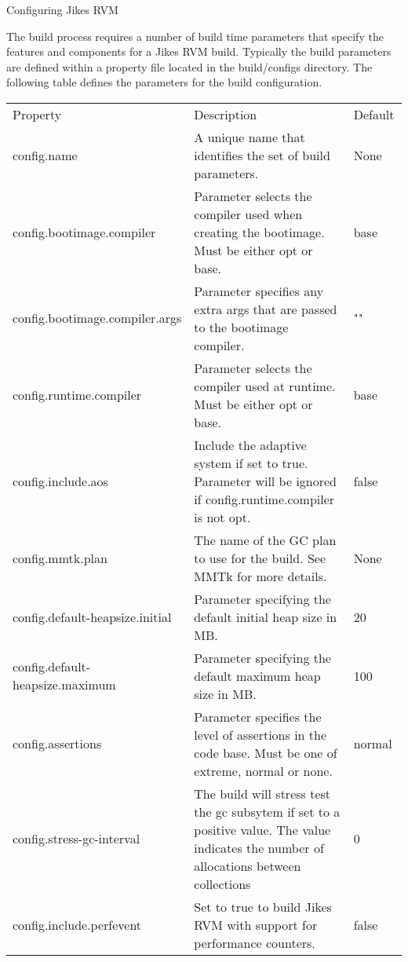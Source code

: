 \begin{section}{Configuring Jikes RVM}
\label{sec:configuringjikesrvm}

The build process requires a number of build time parameters that specify the features and components for a Jikes RVM build. Typically the build parameters are defined within a property file located in the build/configs directory. The following table defines the parameters for the build configuration.

\begin{table}
\centering
\begin{tabular}{p{0.25\linewidth}p{0.6\linewidth}p{0.15\linewidth}}
Property & Description & Default \\
config.name & A unique name that identifies the set of build parameters. & None \\
config.bootimage.\newline compiler & Parameter selects the compiler used when creating the bootimage. Must be either opt or base. & base \\
config.bootimage.\newline compiler.args & Parameter specifies any extra args that are passed to the bootimage compiler. & "" \\
config.runtime.\newline compiler & Parameter selects the compiler used at runtime. Must be either opt or base. & base \\
config.include.\newline aos & Include the adaptive system if set to true. Parameter will be ignored if config.runtime.compiler is not opt. & false \\
config.mmtk.plan & The name of the GC plan to use for the build. See MMTk for more details. & None \\
config.default-heapsize.initial & Parameter specifying the default initial heap size in MB. & 20 \\
config.default-heapsize.maximum & Parameter specifying the default maximum heap size in MB. & 100 \\
config.assertions & Parameter specifies the level of assertions in the code base. Must be one of extreme, normal or none. & normal \\
config.stress-gc-interval & The build will stress test the gc subsytem if set to a positive value. The value indicates the number of allocations between collections & 0 \\
config.include.\newline perfevent & Set to true to build Jikes RVM with support for performance counters. & false \\

\end{tabular}
\end{table}
\end{section}
